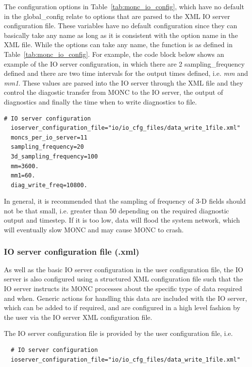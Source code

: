 \documentclass[a4paper,11pt]{article}
\begin{document}
The configuration options in Table~\ref{tab:monc_io_config}, which have no default
in the global\_config relate to options that are parsed to the XML IO server
configuration file. These variables have no default configuration since they can
basically take any name as long as it is consistent with the option name in the
XML file. While the options can take any name, the function is as defined in
Table~\ref{tab:monc_io_config}. For example, the code block below shows an example
of the IO server configuration, in which there are 2 sampling\_frequency defined
and there are two time intervals for the output times defined, i.e. \emph{mm} and
\emph{mm1}. These values are parsed into the IO server through the XML file and
they control the diagostic transfer from MONC to the IO server, the output of
diagnostics and finally the time when to write diagnostics to file.
\begin{lstlisting}[caption={Example of the IO server configuration, taken from
  testcases/radiative\_convective\_equilibrium/RCE\_MO\_cray.mcf}]
  # IO server configuration
  ioserver_configuration_file="io/io_cfg_files/data_write_1file.xml"
  moncs_per_io_server=11
  sampling_frequency=20
  3d_sampling_frequency=100
  mm=3600.
  mm1=60.
  diag_write_freq=10800.
\end{lstlisting}
In general, it is recommended that the sampling of frequency of 3-D fields should not
be that small, i.e. greater than 50 depending on the required diagnostic output
and timestep. If it is too low, data will flood the system network, which will eventually
slow MONC and may cause MONC to crash.

\subsubsection{IO server configuration file (.xml)}

As well as the basic IO server configuration in the user configuration file,
the IO server is also configured using a structured XML configuration file such that the
IO server instructs its MONC processes about the specific type of data required
and when. Generic actions for handling this data are included with the IO server,
which can be added to if required, and are configured in a high level fashion by
the user via the IO server XML configuration file.

The IO server configuration file is provided by the user configuration file, i.e.
\begin{lstlisting}
  # IO server configuration
  ioserver_configuration_file="io/io_cfg_files/data_write_1file.xml"
\end{lstlisting}
\end{document}
